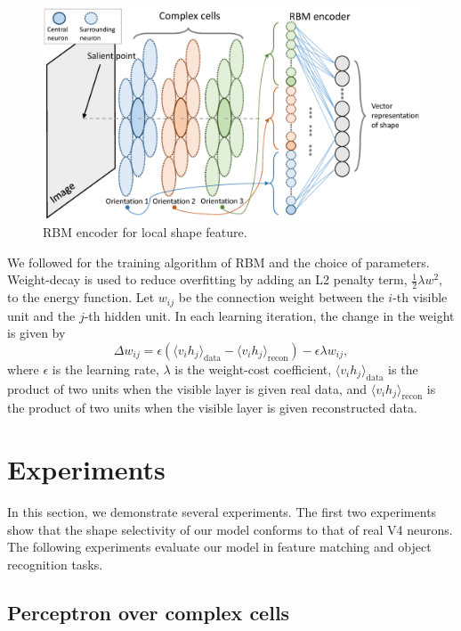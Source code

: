 \documentclass[twocolumn]{article}
\begin{document}
\begin{figure}[!t]
\centerline{\includegraphics[width=0.99\linewidth]{images/fig6.eps}} 
\caption{RBM encoder for local shape feature.}
\label{fig:6}
\end{figure}

We followed \cite{hinton2010} for the training algorithm of RBM and the choice of parameters.
Weight-decay is used to reduce overfitting by adding an L2 penalty term, $\frac{1}{2}\lambda w^2$, to the energy function.
Let $w_{ij}$ be the connection weight between the $i$-th visible unit and the $j$-th hidden unit.
In each learning iteration, the change in the weight is given by
\begin{equation}
\Delta w_{ij}=\epsilon\left(\langle v_i h_j\rangle_\text{data}-\langle v_i h_j\rangle_\text{recon}\right)
-\epsilon\lambda w_{ij},
\end{equation}
where $\epsilon$ is the learning rate, $\lambda$ is the weight-cost coefficient,
$\langle v_i h_j\rangle_\text{data}$ is the product of two units when the visible layer is given real data,
and $\langle v_i h_j\rangle_\text{recon}$ is the product of two units when the visible layer is given reconstructed data.

\section{Experiments}\label{sec:4}

In this section, we demonstrate several experiments.
The first two experiments show that the shape selectivity of our model conforms to that of real V4 neurons.
The following experiments evaluate our model in feature matching and object recognition tasks.

\subsection{Perceptron over complex cells}
\end{document}
